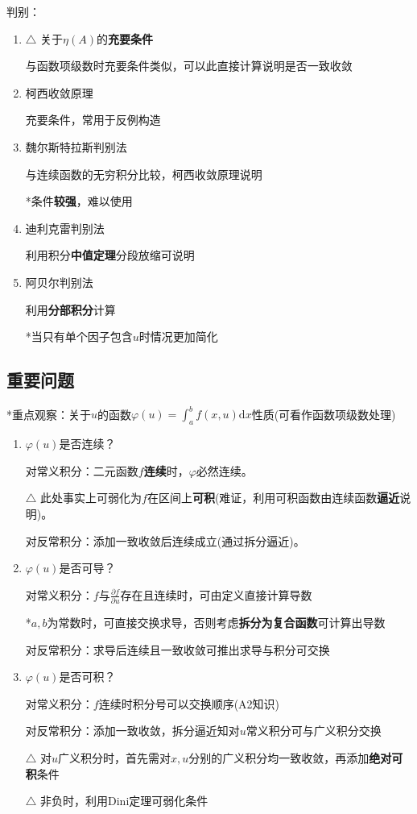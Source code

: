 \documentclass[a4paper,UTF8]{ctexart}
\begin{document}
判别：

\begin{enumerate}
\item $\triangle$ 关于$\eta(A)$的\textbf{充要条件}

与函数项级数时充要条件类似，可以此直接计算说明是否一致收敛

\item 柯西收敛原理

充要条件，常用于反例构造

\item 魏尔斯特拉斯判别法

与连续函数的无穷积分比较，柯西收敛原理说明

*条件\textbf{较强}，难以使用

\item 迪利克雷判别法

利用积分\textbf{中值定理}分段放缩可说明

\item 阿贝尔判别法

利用\textbf{分部积分}计算

*当只有单个因子包含$u$时情况更加简化

\end{enumerate}

\subsection{重要问题}
*重点观察：关于$u$的函数$\varphi(u)=\int_a^bf(x,u)\mathrm{d}x$性质(可看作函数项级数处理)

\begin{enumerate}
\item $\varphi(u)$是否连续？

对常义积分：二元函数$f$\textbf{连续}时，$\varphi$必然连续。

$\triangle$ 此处事实上可弱化为$f$在区间上\textbf{可积}(难证，利用可积函数由连续函数\textbf{逼近}说明)。

对反常积分：添加一致收敛后连续成立(通过拆分逼近)。

\item $\varphi(u)$是否可导？

对常义积分：$f$与$\frac{\partial f}{\partial u}$存在且连续时，可由定义直接计算导数

*$a,b$为常数时，可直接交换求导，否则考虑\textbf{拆分为复合函数}可计算出导数

对反常积分：求导后连续且一致收敛可推出求导与积分可交换

\item $\varphi(u)$是否可积？
	
对常义积分：$f$连续时积分号可以交换顺序(A2知识)

对反常积分：添加一致收敛，拆分逼近知对$u$常义积分可与广义积分交换

$\triangle$ 对$u$广义积分时，首先需对$x,u$分别的广义积分均一致收敛，再添加\textbf{绝对可积}条件

$\triangle$ 非负时，利用Dini定理可弱化条件
\end{enumerate}
\end{document}
